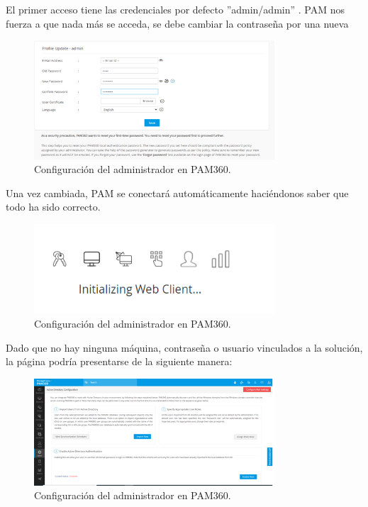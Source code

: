 El primer acceso tiene las credenciales por defecto ''admin/admin'' . PAM nos fuerza a que nada más se acceda, se debe cambiar la contraseña por una nueva

\begin{figure}[H]
	\centering
	\includegraphics[width=0.8\textwidth]{./img/pam_upadteadmin_pass.png}
	\caption{Configuración del administrador en PAM360.}
	\label{fig:pam_upadteadmin_pass}
\end{figure}

Una vez cambiada, PAM se conectará automáticamente haciéndonos saber que todo ha sido correcto.
\begin{figure}[H]
	\centering
	\includegraphics[width=0.8\textwidth]{./img/iniciar_pam.png}
	\caption{Configuración del administrador en PAM360.}
	\label{fig:pam_inicio}
\end{figure}

Dado que no hay ninguna máquina, contraseña o usuario vinculados a la solución, la página podría presentarse de la siguiente manera:

\begin{figure}[H]
	\centering
	\includegraphics[width=0.8\textwidth]{./img/pam_portada_vanilla.png}
	\caption{Configuración del administrador en PAM360.}
	\label{fig:pam_inicio_limpio}
\end{figure}



